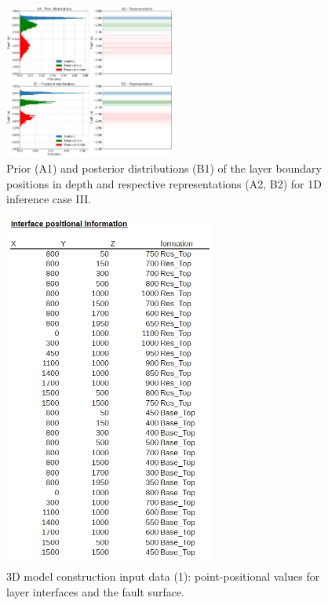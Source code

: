 \documentclass[a4paper,11pt]{MScThesis}
\begin{document}
	\begin{figure}[h]
		\centering
		\includegraphics[width=0.5\textwidth]{Figures/Appendix/update_smallres1}
		\caption{Prior (A1) and posterior distributions (B1) of the layer boundary positions in depth and respective representations (A2, B2) for 1D inference case III.}\label{fig:update_smallres1}
	\end{figure}

    \begin{figure}[h]
    	\centering
    	\includegraphics[width=0.62\textwidth]{Figures/Appendix/CSV_input1}
    	\caption{3D model construction input data (1): point-positional values for layer interfaces and the fault surface.}\label{fig:CSV_input1}
    \end{figure}
\end{document}
